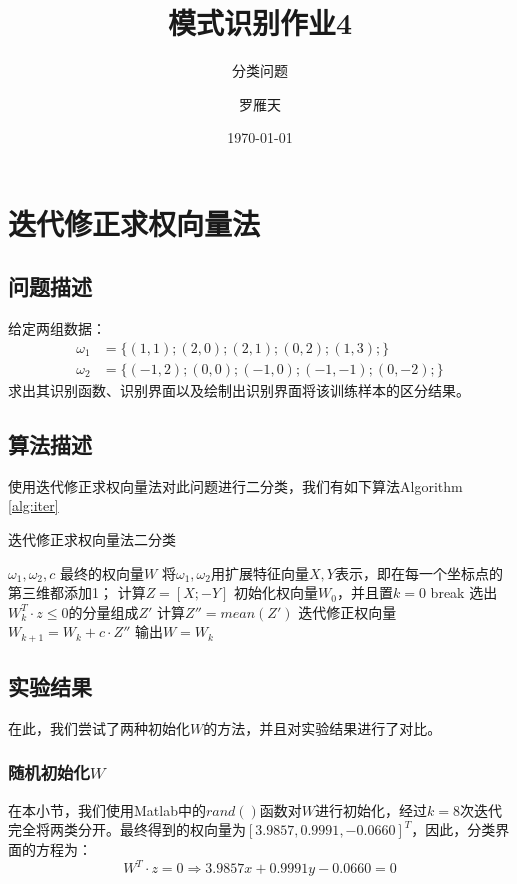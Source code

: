 \documentclass[cn]{elegantbook}
\title{模式识别作业4}
\subtitle{分类问题}
\author{罗雁天}
\institute{清华大学电子系}
\date{\today}
\begin{document}
\maketitle
\tableofcontents
\mainmatter
\hypersetup{pageanchor=true}
\chapter{迭代修正求权向量法}
\section{问题描述}
\noindent 给定两组数据：
\begin{equation}
\begin{aligned}
\omega_1&=\{(1,1); (2,0); (2,1); (0,2); (1,3);\} \\
\omega_2&=\{(-1,2); (0,0); (-1,0); (-1,-1); (0,-2);\}
\end{aligned}
\end{equation}
求出其识别函数、识别界面以及绘制出识别界面将该训练样本的区分结果。

\section{算法描述}
\noindent 使用迭代修正求权向量法对此问题进行二分类，我们有如下算法Algorithm \ref{alg:iter}
\begin{algorithm}[htb]
	\caption{迭代修正求权向量法二分类}
	\label{alg:iter}
	\begin{algorithmic}[1]
		\Require $\omega_1, \omega_2, c$
		\Ensure 最终的权向量$W$
		\State 将$\omega_1, \omega_2$用扩展特征向量$X,Y$表示，即在每一个坐标点的第三维都添加1；
		\State 计算$Z=[X;-Y]$
		\State 初始化权向量$W_0$，并且置$k=0$
		\State break
		\Else
		\State 选出$W_k^T\cdot z\le0$的分量组成$Z'$
		\State 计算$Z''=mean(Z')$
		\State 迭代修正权向量$W_{k+1}=W_k+c\cdot Z''$
		\EndIf
		\EndWhile
		\State 输出$W=W_k$
	\end{algorithmic}
\end{algorithm}

\section{实验结果}
在此，我们尝试了两种初始化$W$的方法，并且对实验结果进行了对比。

\subsection{随机初始化$W$}
在本小节，我们使用Matlab中的$rand()$函数对$W$进行初始化，经过$k=8$次迭代完全将两类分开。最终得到的权向量为$[3.9857,0.9991,-0.0660]^T$，因此，分类界面的方程为：
\begin{equation}
W^T\cdot z=0\Rightarrow 3.9857x + 0.9991y - 0.0660=0
\end{equation}
\end{document}
